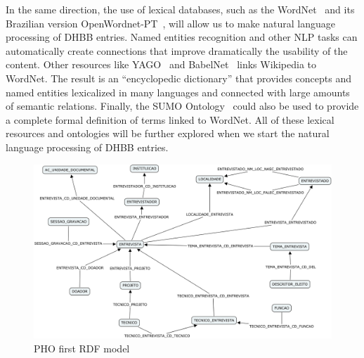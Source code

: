 In the same direction, the use of lexical databases, such as the
WordNet~\cite{wordnet} and its Brazilian version
OpenWordnet-PT~\cite{wordnet-br}, will allow us to make natural language processing
of DHBB entries. Named entities recognition and other
NLP tasks can automatically create connections that improve
dramatically the usability of the content.
Other resources like YAGO~\cite{yago} and BabelNet~\cite{babelnet}
links Wikipedia to WordNet. The result is an ``encyclopedic
dictionary'' that provides concepts and named entities lexicalized in
many languages and connected with large amounts of semantic
relations. Finally, the SUMO Ontology~\cite{sumo} could also be used
to provide a complete formal definition of terms linked to
WordNet. All of these lexical resources and ontologies will be further
explored when we start the natural language processing of DHBB
entries.


\begin{figure}[htbp]
  \centering
  \includegraphics[width=.8\textwidth]{pho.png}
  \caption{PHO first RDF model}\label{fig:pho}
\end{figure}


